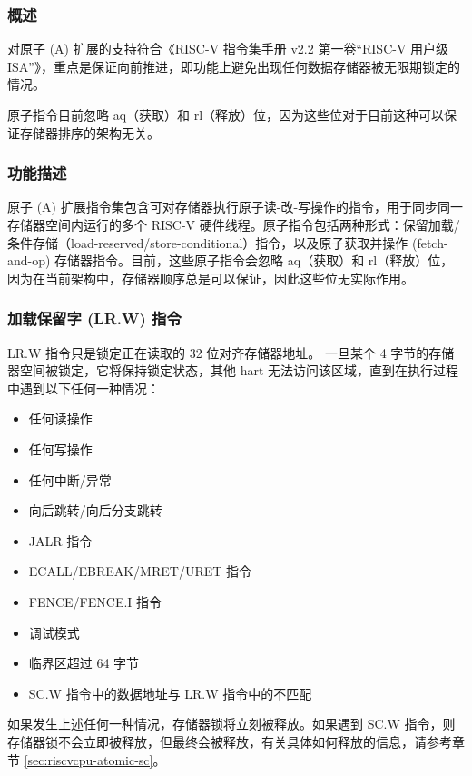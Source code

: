 \documentclass[main\_\_CN.tex]{subfiles}
\begin{document}
\subsubsection{概述}
\label{sec:riscvcpu-atomic-overview}

对原子 (A) 扩展的支持符合《RISC-V 指令集手册 v2.2 第一卷“RISC-V 用户级 ISA”》，重点是保证向前推进，即功能上避免出现任何数据存储器被无限期锁定的情况。

原子指令目前忽略 aq（获取）和 rl（释放）位，因为这些位对于目前这种可以保证存储器排序的架构无关。

\subsubsection{功能描述}
\label{sec:riscvcpu-atomic-func-descr}

原子 (A) 扩展指令集包含可对存储器执行原子读-改-写操作的指令，用于同步同一存储器空间内运行的多个 RISC-V 硬件线程。原子指令包括两种形式：保留加载/条件存储（load-reserved/store-conditional）指令，以及原子获取并操作 (fetch-and-op) 存储器指令。目前，这些原子指令会忽略 aq（获取）和 rl（释放）位，因为在当前架构中，存储器顺序总是可以保证，因此这些位无实际作用。

\subsubsection{加载保留字 (LR.W) 指令}
\label{sec:riscvcpu-atomic-lr}

LR.W 指令只是锁定正在读取的 32 位对齐存储器地址。 一旦某个 4 字节的存储器空间被锁定，它将保持锁定状态，其他 hart 无法访问该区域，直到在执行过程中遇到以下任何一种情况：

\begin{itemize}
    \item 任何读操作
    \item 任何写操作
    \item 任何中断/异常
    \item 向后跳转/向后分支跳转
    \item JALR 指令
    \item ECALL/EBREAK/MRET/URET 指令
    \item FENCE/FENCE.I 指令
    \item 调试模式
    \item 临界区超过 64 字节
    \item SC.W 指令中的数据地址与 LR.W 指令中的不匹配
\end{itemize}

如果发生上述任何一种情况，存储器锁将立刻被释放。如果遇到 SC.W 指令，则存储器锁不会立即被释放，但最终会被释放，有关具体如何释放的信息，请参考章节 \ref{sec:riscvcpu-atomic-sc}。
\end{document}
